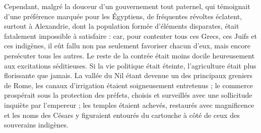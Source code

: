 \documentclass[a4paper, 11pt, oneside]{article}
\begin{document}
Cependant, malgré la douceur d'un gouvernement tout paternel, qui témoignait d'une préférence marquée pour les Égyptiens, de fréquentes révoltes éclatent, surtout à Alexandrie, dont la population formée d'éléments disparates, était fatalement impossible à satisfaire : car, pour contenter tous ces Grecs, ces Juifs et ces indigènes, il eût fallu non pas seulement favoriser chacun d'eux, mais encore persécuter tous les autres. Le reste de la contrée était moins docile heureusement aux excitations séditieuses. Si la vie politique était éteinte, l'agriculture était plus florissante que jamais. La vallée du Nil étant devenue un des principaux greniers de Rome, les canaux d'irrigation étaient soigneusement entretenus ; le commerce prospérait sous la protection des préfets, choisis et surveillés avec une sollicitude inquiète par l'empereur ; les temples étaient achevés, restaurés avec magnificence et les noms des Césars y figuraient entourés du cartouche à côté de ceux des souverains indigènes.
\end{document}
